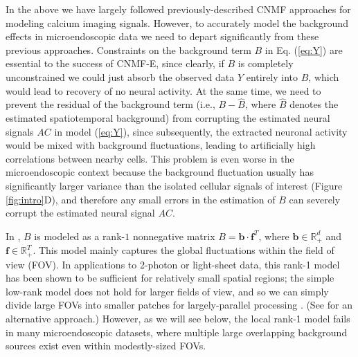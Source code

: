 \documentclass[9pt,lineno]{elife}
\begin{document}
In the above we have largely followed previously-described CNMF approaches \citep{Pnevmatikakis2016} for modeling calcium imaging signals. However, to accurately model the background effects in microendoscopic data we need to depart significantly from these previous approaches.
Constraints on the background term $B$ in Eq. (\ref{eq:Y}) are essential to the success of CNMF-E, since clearly, if $B$ is completely unconstrained we could just absorb the observed data $Y$ entirely into $B$, which would lead to recovery of no neural activity. At the same time, we need to prevent the residual of the background term (i.e., $B-\hat{B}$, where $\hat{B}$ denotes the estimated spatiotemporal background) from corrupting the estimated neural signals $AC$ in model (\ref{eq:Y}), since subsequently, the extracted neuronal activity would be mixed with background fluctuations, leading to artificially high correlations between nearby cells. This problem is even worse in the microendoscopic context because the background fluctuation usually has significantly larger variance than the isolated cellular signals of interest (Figure \ref{fig:intro}D), and therefore any small errors in the estimation of $B$ can severely corrupt the estimated neural signal $AC$. 

In \citep{Pnevmatikakis2016}, $B$ is modeled as a rank-$1$ nonnegative matrix $B=\bm{b}\cdot \bm{f}^T$, where $\bm{b}\in \mathbb{R}_+^d$ and $\bm{f}\in \mathbb{R}_+^T$. This model mainly captures the global fluctuations within the field of view (FOV). In applications to 2-photon or light-sheet data, this rank-1 model has been shown to be sufficient for relatively small spatial regions; the simple low-rank model does not hold for larger fields of view, and so we can simply divide large FOVs into smaller patches for largely-parallel processing \citep{Pnevmatikakis2016,giovannucci2017}. (See \citep{Pachitariu2016} for an alternative approach.) However, as we will see below, the local rank-1 model fails in many microendoscopic datasets, where multiple large overlapping background sources exist even within modestly-sized FOVs. 
\end{document}
